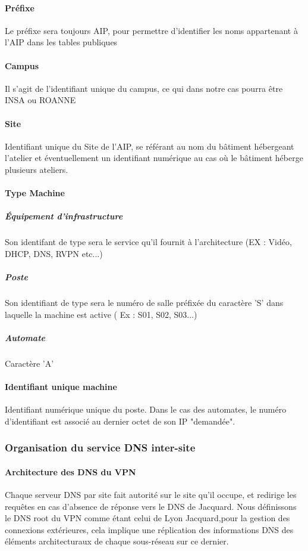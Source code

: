 \documentclass[a4paper]{article}
\begin{document}
\paragraph{Préfixe}
Le préfixe sera toujours AIP, pour permettre d'identifier les noms appartenant à l'AIP dans les tables publiques

\paragraph{Campus}
Il s'agit de l'identifiant unique du campus, ce qui dans notre cas pourra être INSA ou ROANNE

\paragraph{Site}
Identifiant unique du Site de l'AIP, se référant au nom du bâtiment hébergeant l'atelier et éventuellement un identifiant numérique au cas où le bâtiment héberge plusieurs ateliers. 

\paragraph{Type Machine}

\subparagraph{Équipement d'infrastructure}

Son identifant de type sera le service qu'il fournit à l'architecture (EX : Vidéo, DHCP, DNS, RVPN etc...)

\subparagraph{Poste}

Son identifiant de type sera le numéro de salle préfixée du caractère 'S' dans laquelle la machine est active ( Ex : S01, S02, S03...)

\subparagraph{Automate}

Caractère 'A'

\paragraph{Identifiant unique machine}
Identifiant numérique unique du poste. Dans le cas des automates, le numéro d'identifiant est associé au dernier octet de son IP "demandée".

\subsubsection{Organisation du service DNS inter-site}

\paragraph{Architecture des DNS du VPN}
Chaque serveur DNS par site fait autorité sur le site qu'il occupe, et redirige les requêtes en cas d'absence de réponse vers le DNS de Jacquard.
Nous définissons le DNS root du VPN comme étant celui de Lyon Jacquard,pour la gestion des connexions extérieures,
cela implique une réplication des informations DNS des éléments architecturaux de chaque sous-réseau sur ce dernier.
\end{document}
